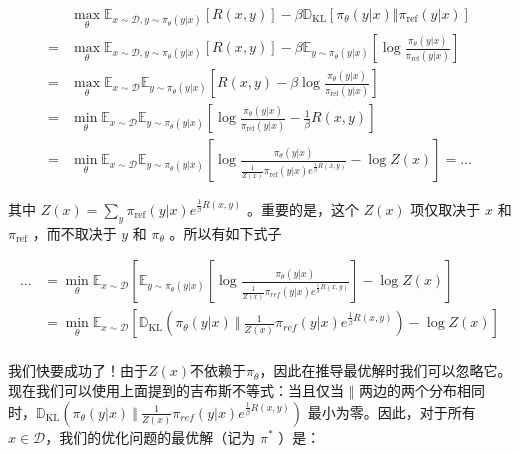 \documentclass[lang=cn,newtx,10pt,scheme=chinese]{elegantbook}
\begin{document}
\begin{equation}
\begin{aligned}
& \max_\theta\mathbb{E}_{x\sim\mathcal{D},y\sim\pi_\theta(y|x)}[R(x,y)]-\beta\mathbb{D}_\text{KL}[\pi_\theta(y|x)\Vert\pi_\text{ref}(y|x)] \\
= & \max_\theta\mathbb{E}_{x\sim\mathcal{D},y\sim\pi_\theta(y|x)}[R(x,y)]-\beta\mathbb{E}_{y\sim\pi_\theta(y|x)}\left[{\log\frac{\pi_\theta(y|x)}{\pi_\text{ref}(y|x)}}\right] \\
= & \max_\theta\mathbb{E}_{x\sim\mathcal{D}}\mathbb{E}_{y\sim\pi_\theta(y|x)}\left[{R(x,y)-\beta\log\frac{\pi_\theta(y|x)}{\pi_\text{ref}(y|x)}}\right] \\
= & \min_\theta\mathbb{E}_{x\sim\mathcal{D}}\mathbb{E}_{y\sim\pi_\theta(y|x)}\left[{\log\frac{\pi_\theta(y|x)}{\pi_\text{ref}(y|x)}-\frac{1}{\beta}R(x,y)}\right] \\
= & \min_{\theta}\mathbb{E}_{x\sim \mathcal{D}}\mathbb{E}_{y\sim \pi_\theta(y|x)}\left[\log\frac{\pi_\theta(y|x)}{\frac{1}{Z(x)}\pi_{\text{ref}}(y|x)e^{\frac{1}{\beta}R(x,y)}} - \log Z(x)\right] = \dots
\end{aligned}
\end{equation}

其中 $Z(x)=\sum_y\pi_{\text{ref}}(y|x)e^{\frac{1}{\beta}R(x,y)}$ 。重要的是，这个 $Z(x)$ 项仅取决于 $x$ 和 $\pi_\text{ref}$ ，而不取决于 $y$ 和 $\pi_\theta$ 。所以有如下式子

\begin{equation}
\begin{aligned}
\dots &= \min_{\theta}\mathbb{E}_{x\sim \mathcal{D}}\left[\mathbb{E}_{y\sim \pi_\theta(y|x)}\left[\log\frac{\pi_\theta(y|x)}{\frac{1}{Z(x)}\pi_{ref}(y|x)e^{\frac{1}{\beta}R(x,y)}}\right] - \log Z(x)\right] \\
&= \min_{\theta}\mathbb{E}_{x\sim \mathcal{D}}\left[\mathbb{D}_\text{KL}\left(\pi_\theta(y|x)\ \Vert\ \frac{1}{Z(x)}\pi_{ref}(y|x)e^{\frac{1}{\beta}R(x,y)}\right) - \log Z(x)\right] \\
\end{aligned}
\end{equation}

我们快要成功了！由于$Z(x)$不依赖于$\pi_\theta$，因此在推导最优解时我们可以忽略它。现在我们可以使用上面提到的吉布斯不等式：当且仅当 $\Vert$ 两边的两个分布相同时，$\mathbb{D}_\text{KL}\left(\pi_\theta(y|x)\ \Vert\ \frac{1}{Z(x)}\pi_{ref}(y|x)e^{\frac{1}{\beta}R(x,y)}\right)$ 最小为零。因此，对于所有$x\in \mathcal{D}$，我们的优化问题的最优解（记为 $\pi^*$ ）是：
\end{document}
